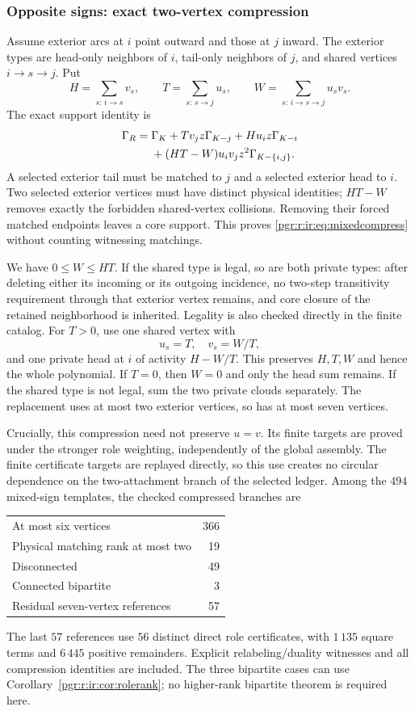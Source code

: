 \documentclass[11pt]{article}
\numberwithin{equation}{section}
\theoremstyle{definition}\newtheorem{definition}[theorem]{Definition}\newtheorem{remark}[theorem]{Remark}
\newcommand{\Ga}{\Gamma}                   %
\begin{document}
\subsubsection{Opposite signs: exact two-vertex compression}
Assume exterior arcs at $i$ point outward and those at $j$ inward. The exterior types are head-only neighbors of $i$, tail-only neighbors of $j$, and shared vertices $i\to s\to j$. Put
\[
 H=\sum_{s:\,i\to s}v_s,
 \qquad T=\sum_{s:\,s\to j}u_s,
 \qquad W=\sum_{s:\,i\to s\to j}u_s v_s.
\]
The exact support identity is
\begin{align}\label{pgr:r:ir:eq:mixedcompress}
 \Ga_R={}&\Ga_K+T v_jz\Ga_{K-j}+H u_i z\Ga_{K-i}\notag\\
 &+(HT-W)u_i v_j z^2\Ga_{K-\{i,j\}}.
\end{align}
A selected exterior tail must be matched to $j$ and a selected exterior head to $i$. Two selected exterior vertices must have distinct physical identities; $HT-W$ removes exactly the forbidden shared-vertex collisions. Removing their forced matched endpoints leaves a core support. This proves \eqref{pgr:r:ir:eq:mixedcompress} without counting witnessing matchings.

We have $0\le W\le HT$. If the shared type is legal, so are both private types: after deleting either its incoming or its outgoing incidence, no two-step transitivity requirement through that exterior vertex remains, and core closure of the retained neighborhood is inherited. Legality is also checked directly in the finite catalog. For $T>0$, use one shared vertex with
\[
 u_s=T,\quad v_s=W/T,
\]
and one private head at $i$ of activity $H-W/T$. This preserves $H,T,W$ and hence the whole polynomial. If $T=0$, then $W=0$ and only the head sum remains. If the shared type is not legal, sum the two private clouds separately. The replacement uses at most two exterior vertices, so has at most seven vertices.

Crucially, this compression need not preserve $u=v$. Its finite targets are proved under the stronger role weighting, independently of the global assembly. The finite certificate targets are replayed directly, so this use creates no circular dependence on the two-attachment branch of the selected ledger. Among the $494$ mixed-sign templates, the checked compressed branches are
\begin{center}
\begin{tabular}{lr}
At most six vertices&366\\
Physical matching rank at most two&19\\
Disconnected&49\\
Connected bipartite&3\\
Residual seven-vertex references&57
\end{tabular}
\end{center}
The last $57$ references use $56$ distinct direct role certificates, with $1\,135$ square terms and $6\,445$ positive remainders. Explicit relabeling/duality witnesses and all compression identities are included. The three bipartite cases can use Corollary~\ref{pgr:r:ir:cor:rolerank}; no higher-rank bipartite theorem is required here.
\end{document}
